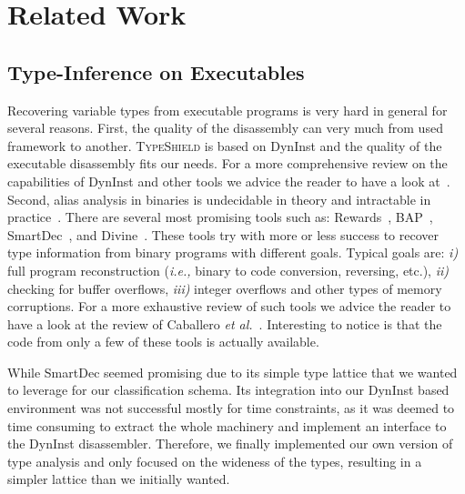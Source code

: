 \section{Related Work}
\label{chapter:Related_Work}

\subsection{Type-Inference on Executables}
\label{Type-Inference on Executables}
Recovering variable types from executable programs
is very hard in general for several reasons. 
First, the quality of the disassembly can very much from used
framework to another. \textsc{TypeShield} is based on DynInst 
and the quality of the executable disassembly fits our needs. 
For a more comprehensive review on the capabilities of DynInst and other tools we
advice the reader to have a look at~\cite{andriesse:indepth}.
Second, alias analysis in binaries is undecidable in theory and intractable in practice~\cite{alan:mycroft}.
There are several most promising tools such as: Rewards~\cite{lin:rewards}, BAP~\cite{bap:brumley}, 
SmartDec~\cite{fokin:smartdec}, and Divine~\cite{divine:balakrishnan}.
These tools try with more or less success to recover 
type information from binary programs with different goals.
Typical goals are: 
\textit{i)} full program reconstruction (\textit{i.e.,} binary to code conversion, reversing, etc.), 
\textit{ii)} checking for buffer overflows, 
\textit{iii)} integer overflows and other types of memory corruptions.
For a more exhaustive review of such tools we advice the reader to
have a look at the review of Caballero \textit{et al.}~\cite{caballero:inference}.
Interesting to notice is that the code from only a few of these tools is actually available.

While SmartDec seemed promising due to its simple type lattice that we wanted to leverage for our classification schema. 
Its integration into our DynInst based environment was not successful mostly for time constraints, as it was deemed to 
time consuming to extract the whole machinery and implement an interface to the DynInst disassembler.
Therefore, we finally implemented our own version of type analysis and only focused on the wideness of the types, 
resulting in a simpler lattice than we initially wanted.

